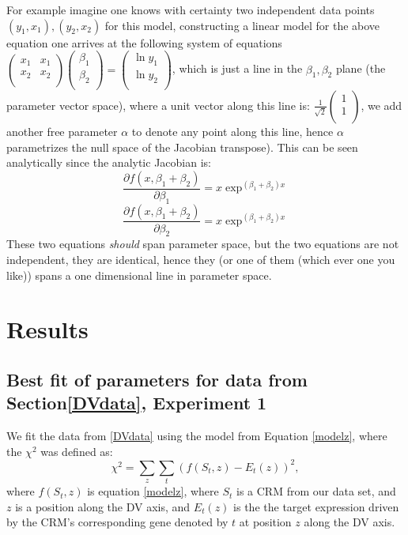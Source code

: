 For example imagine one knows with certainty two independent data points $(y_1, x_1), (y_2,x_2)$ for this model, constructing a linear model for the above equation one arrives at the following system of equations $\begin{pmatrix}  x_1&x_1\\ x_2 & x_2\\ \end{pmatrix} \begin{pmatrix} \beta_1\\ \beta_2 \\ \end{pmatrix} = \begin{pmatrix} \ln{y_1}\\ \ln{y_2} \\ \end{pmatrix} $, which is just a line in the $\beta_1,\beta_2$ plane (the parameter vector space), where a unit vector along this line is: $\frac{1}{\sqrt{2}}\begin{pmatrix} 1\\ 1\\ \end{pmatrix} $, we add another free parameter $\alpha$ to denote any point along this line, hence $\alpha$ parametrizes the null space of the Jacobian transpose).  This can be seen analytically since the analytic Jacobian is:
\begin{equation}
\frac{\partial{f(x,\beta_1+\beta_2)}}{\partial \beta_1} = x \exp^{(\beta_1 +\beta_2)x}
\end{equation}
\begin{equation}
\frac{\partial{f(x,\beta_1+\beta_2)}}{\partial \beta_2} = x \exp^{(\beta_1 +\beta_2)x}
\end{equation}
These two equations \emph{should} span parameter space, but the two equations are not independent, they are identical, hence they (or one of them (which ever one you like)) spans a one dimensional line in parameter space.
\section{Results}
\subsection{Best fit of parameters for data from Section\ref{DVdata}, Experiment 1}

We fit the data from \ref{DVdata} using the model from Equation \ref{modelz}, where the $\chi^2$ was defined as:
\begin{equation}\label{chi2}
\chi^2 = \sum_z \sum_t (f(S_t,z) - E_t(z) )^2,
\end{equation}
where $f(S_t,z)$ is equation \ref{modelz}, where $S_t$ is a CRM from our data set, and $z$ is a position along the DV axis, and $E_t(z)$ is the the  target expression driven by the CRM's corresponding gene denoted by $t$ at position $z$ along the DV axis. 

